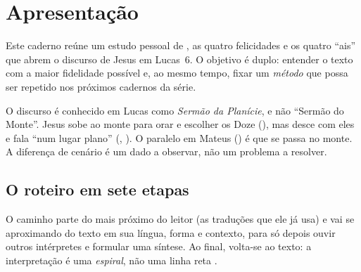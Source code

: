 \chapter{Apresentação}

Este caderno reúne um estudo pessoal de , as quatro felicidades
e os quatro \enquote{ais} que abrem o discurso de Jesus em Lucas~6. O
objetivo é duplo: entender o texto com a maior fidelidade possível e, ao mesmo
tempo, fixar um \emph{método} que possa ser repetido nos próximos cadernos da
série.

\begin{nota}
O discurso é conhecido em Lucas como \emph{Sermão da Planície}, e não
\enquote{Sermão do Monte}. Jesus sobe ao monte para orar e escolher os Doze
(), mas desce com eles e fala \enquote{num lugar plano}
(, ). O paralelo em Mateus () é
que se passa no monte. A diferença de cenário é um dado a observar, não um
problema a resolver.
\end{nota}

\section{O roteiro em sete etapas}

O caminho parte do mais próximo do leitor (as traduções que ele já usa) e vai
se aproximando do texto em sua língua, forma e contexto, para só depois ouvir
outros intérpretes e formular uma síntese. Ao final, volta-se ao texto: a
interpretação é uma \emph{espiral}, não uma linha reta \parencite{osborne2006}.

